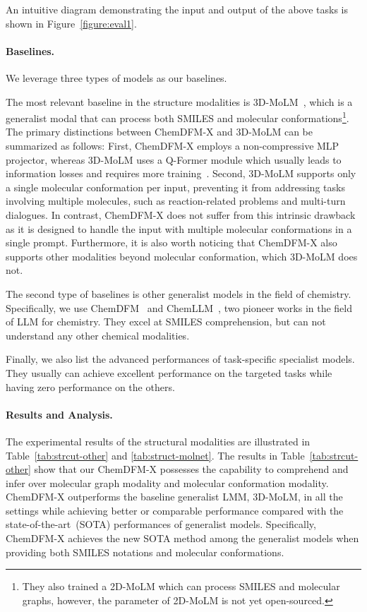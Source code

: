 An intuitive diagram demonstrating the input and output of the above tasks is shown in Figure~\ref{figure:eval1}.

\paragraph{Baselines.} We leverage three types of models as our baselines. 

The most relevant baseline in the structure modalities is 3D-MoLM~\cite{li2024molm}, which is a generalist modal that can process both SMILES and molecular conformations\footnote{They also trained a 2D-MoLM which can process SMILES and molecular graphs, however, the parameter of 2D-MoLM is not yet open-sourced.}. The primary distinctions between ChemDFM-X and 3D-MoLM can be summarized as follows: First, ChemDFM-X employs a non-compressive MLP projector, whereas 3D-MoLM uses a Q-Former module which usually leads to information losses and requires more training~\cite{yao2024decodecouplingtokencompression}. Second, 3D-MoLM supports only a single molecular conformation per input, preventing it from addressing tasks involving multiple molecules, such as reaction-related problems and multi-turn dialogues. In contrast, ChemDFM-X does not suffer from this intrinsic drawback as it is designed to handle the input with multiple molecular conformations in a single prompt. Furthermore, it is also worth noticing that ChemDFM-X also supports other modalities beyond molecular conformation, which 3D-MoLM does not.

The second type of baselines is other generalist models in the field of chemistry. Specifically, we use ChemDFM~\cite{zhao2024chemdfm} and ChemLLM~\cite{zhang2024chemllm}, two pioneer works in the field of LLM for chemistry. They excel at SMILES comprehension, but can not understand any other chemical modalities.

Finally, we also list the advanced performances of task-specific specialist models. They usually can achieve excellent performance on the targeted tasks while having zero performance on the others.

\paragraph{Results and Analysis.} The experimental results of the structural modalities are illustrated in Table~\ref{tab:strcut-other} and \ref{tab:struct-molnet}. The results in Table~\ref{tab:strcut-other} show that our ChemDFM-X possesses the capability to comprehend and infer over molecular graph modality and molecular conformation modality. ChemDFM-X outperforms the baseline generalist LMM, 3D-MoLM, in all the settings while achieving better or comparable performance compared with the state-of-the-art~(SOTA) performances of generalist models. Specifically, ChemDFM-X achieves the new SOTA method among the generalist models when providing both SMILES notations and molecular conformations.

